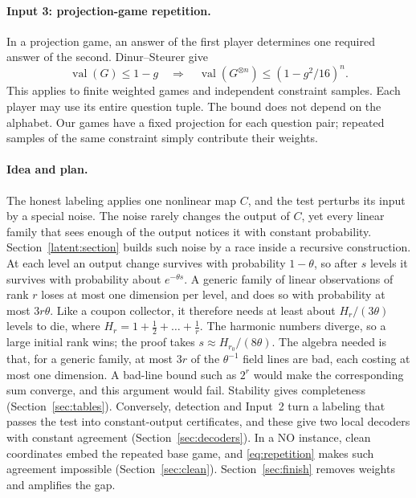 \documentclass[11pt]{article}
\newcommand{\val}{\operatorname{val}}
\begin{document}
\paragraph{Input 3: projection-game repetition.}
In a projection game, an answer of the first player determines one required
answer of the second. Dinur--Steurer \cite[Corollary 1.2]{DS} give
\begin{equation}\label{eq:repetition}
 \val(G)\le1-g\quad\Longrightarrow\quad
 \val(G^{\otimes n})\le(1-g^2/16)^n.
\end{equation}
This applies to finite weighted games and independent constraint samples.
Each player may use its entire question tuple. The bound does not depend
on the alphabet. Our games have a fixed projection for each question pair;
repeated samples of the same constraint simply contribute their weights.

\paragraph{Idea and plan.}
The honest labeling applies one nonlinear map $C$, and the test perturbs
its input by a special noise. The noise rarely changes the output of $C$,
yet every linear family that sees enough of the output notices it with
constant probability. Section~\ref{latent:section} builds such noise by a
race inside a recursive construction. At each level an output change
survives with probability $1-\theta$, so after $s$ levels it survives with
probability about $e^{-\theta s}$. A generic family of linear observations
of rank $r$ loses at most one dimension per level, and does so with
probability at most $3r\theta$. Like a coupon collector, it therefore needs
at least about $H_r/(3\theta)$ levels to die, where
$H_r=1+\frac12+\dots+\frac1r$. The harmonic numbers diverge, so a large
initial rank wins; the proof takes $s\approx H_{r_0}/(8\theta)$. The algebra
needed is that, for a generic family, at most $3r$ of the $\theta^{-1}$ field
lines are bad, each costing at most one dimension. A bad-line bound such as
$2^r$ would make the corresponding sum converge, and this argument would
fail. Stability gives completeness
(Section~\ref{sec:tables}). Conversely, detection and Input~2 turn a labeling
that passes the test into constant-output certificates, and these give two
local decoders with constant agreement (Section~\ref{sec:decoders}). In a NO
instance, clean coordinates embed the repeated base game, and
\eqref{eq:repetition} makes such agreement impossible
(Section~\ref{sec:clean}). Section~\ref{sec:finish} removes weights and
amplifies the gap.
\end{document}
